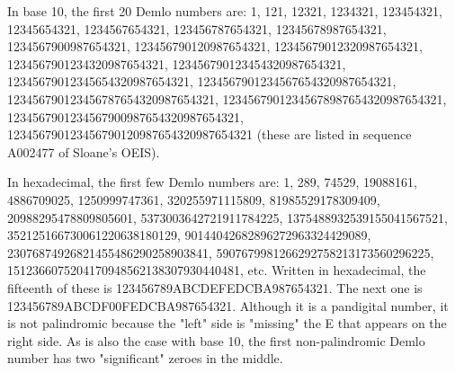 \documentclass[12pt]{article}
\begin{document}
In base 10, the first 20 Demlo numbers are: 1, 121, 12321, 1234321, 123454321, 12345654321, 1234567654321, 123456787654321, 12345678987654321, 1234567900987654321, 123456790120987654321, 12345679012320987654321, 1234567901234320987654321, 123456790123454320987654321, 12345679012345654320987654321, 1234567901234567654320987654321, 123456790123456787654320987654321, 12345679012345678987654320987654321, 1234567901234567900987654320987654321, 123456790123456790120987654320987654321 (these are listed in sequence A002477 of Sloane's OEIS).

In hexadecimal, the first few Demlo numbers are: 1, 289, 74529, 19088161, 4886709025, 1250999747361, 320255971115809, 81985529178309409, 20988295478809805601, 5373003642721911784225, 1375488932539155041567521, 352125166730061220638180129, 90144042682896272963324429089, 23076874926821455486290258903841, 5907679981266292758213173560296225, 1512366075204170948562138307930440481, etc. Written in hexadecimal, the fifteenth of these is 123456789ABCDEFEDCBA987654321. The next one is 
123456789ABCDF00FEDCBA987654321. Although it is a pandigital number, it is not palindromic because the "left" side is "missing" the E that appears on the right side. As is also the case with base 10, the first non-palindromic Demlo number has two "significant" zeroes in the middle.
\end{document}
